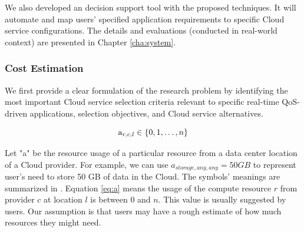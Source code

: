 We also developed an decision support tool with the proposed techniques. It will automate and map users' specified application requirements to specific Cloud service configurations. The details and evaluations (conducted in real-world context) are presented in Chapter \ref{cha:system}.

\subsubsection{Cost Estimation}
We first provide a clear formulation of the research problem by identifying the most important Cloud service selection criteria relevant to specific real-time QoS-driven applications, selection objectives, and Cloud service alternatives.


\begin{equation}
{{\rm{a}}_{r,c,l}} \in \{ 0,1, \ldots ,n\}\label{eq:a}
\end{equation}

Let "a" be the resource usage of a particular resource from a data center location of a Cloud provider. For example, we can use $a_{storage,any,any}=50 GB$ to represent user's need to store 50 GB of data in the Cloud. The symbols' meanings are summarized in . Equation \eqref{eq:a} means the usage of the compute resource $r$ from provider $c$ at location $l$ is between $0$ and $n$. This value is usually suggested by users. Our assumption is that users may have a rough estimate of how much resources they might need.

